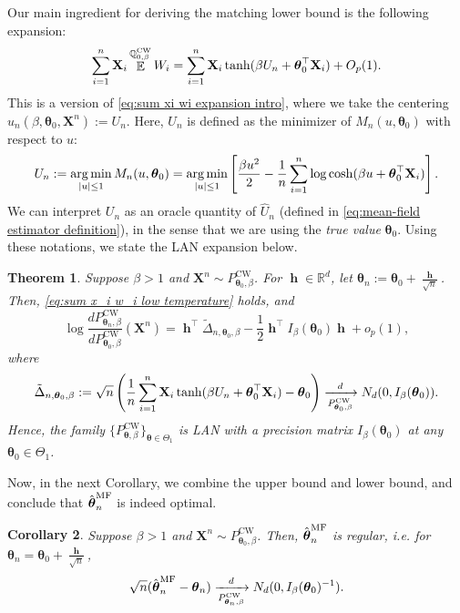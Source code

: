 \documentclass[preprint,reqno]{imsart}
\newtheorem{thm}{Theorem}[section]
\newtheorem{cor}[thm]{Corollary}
\newcommand{\ttheta}{\boldsymbol{\theta}}
\DeclareMathOperator{\bh}{\textbf{h}}
\DeclareMathOperator{\EE}{\mathbb{E}}
\DeclareMathOperator{\QQ}{\mathbb{Q}}
\newcommand{\X}{\mathbf{X}}
\DeclareMathOperator{\sumin}{\sum_{\mathnormal i=1}^{\mathnormal n}}
\newcommand{\thetamf}{\hat{\boldsymbol \theta}^{\text{MF}}_{\mathnormal n}}
\DeclareMathOperator*{\argmin}{arg\,min}
\begin{document}
Our main ingredient for deriving the matching lower bound is the following expansion: 
\begin{equation}\label{eq:sum x_i w_i low temperature}
    \sumin \X_i \EE^{\QQ_{0,\beta}^\text{CW}} W_i = \sumin \X_i \tanh(\beta U_n + \ttheta_0^\top \X_i) + O_p(1).
\end{equation}
This is a version of \eqref{eq:sum xi wi expansion intro}, where we take the centering $u_n(\beta, \ttheta_0, \X^n) := U_n$.
Here, $U_n$ is defined as the minimizer of $M_{n}(u, \ttheta_0)$ with respect to $u$: 
\begin{equation}\label{eq:u_n defi}
    U_n := \argmin_{|u| \le 1} M_n(u, \ttheta_0) = \argmin_{|u| \le 1} \left[ \frac{\beta u^2}{2} -\frac{1}{n} \sumin \log \cosh(\beta u + \ttheta_0^{\top} \X_i) \right].
\end{equation}
We can interpret $U_n$ as an oracle quantity of $\hat{U}_n$ (defined in \eqref{eq:mean-field estimator definition}), in the sense that we are using the \emph{true value} $\ttheta_0$.
Using these notations, we state the LAN expansion below.

\begin{thm}\label{thm:lower bound}
    Suppose $\beta > 1$ and $\X^n \sim P_{\ttheta_0, \beta}^\text{CW}$. For $\bh \in \mathbb{R}^d$, let $\ttheta_n := \ttheta_0+\frac{\bh}{\sqrt{n}}$. Then, \eqref{eq:sum x_i w_i low temperature} holds, and 
    $$\log \frac{dP_{\ttheta_n, \beta}^\text{CW}}{dP_{\ttheta_0, \beta}^\text{CW}} (\X^n) = \bh^{\top} \tilde{\Delta}_{n, \ttheta_0, \beta}- \frac{1}{2} \bh^\top I_\beta(\ttheta_0) \bh + o_p(1),$$
    where $$\tilde{\Delta}_{n, \ttheta_0, \beta} := \sqrt{n} \left(\frac{1}{n} \sumin \X_i \tanh(\beta U_n + \ttheta_0^\top \X_i) - \ttheta_0 \right) \xrightarrow[P_{\ttheta_0, \beta}^\text{CW}]{d} N_d (0, I_\beta(\ttheta_0)).$$
    Hence, the family $\{P_{\ttheta,\beta}^{\text{CW}} \}_{\ttheta\in \Theta_1}$ is LAN with a precision matrix $I_\beta(\ttheta_0)$ at any $\ttheta_0 \in \Theta_1$.
\end{thm}


Now, in the next Corollary, we combine the upper bound and lower bound, and conclude that $\thetamf$ is indeed optimal. 
%
%
%
%
%
%
\begin{cor}\label{cor:low tmp}
    Suppose $\beta > 1$ and $\X^n \sim P_{\ttheta_0, \beta}^{\text{CW}}$.
    Then, $\thetamf$ is regular, i.e. for $\ttheta_n = \ttheta_0 + \frac{\bh}{\sqrt{n}}$, $$\sqrt{n}(\thetamf - \ttheta_n) \xrightarrow[P_{\ttheta_n,\beta}^\text{CW}]{d} N_d(0, I_\beta(\ttheta_0)^{-1}).$$
\end{cor}
\end{document}
